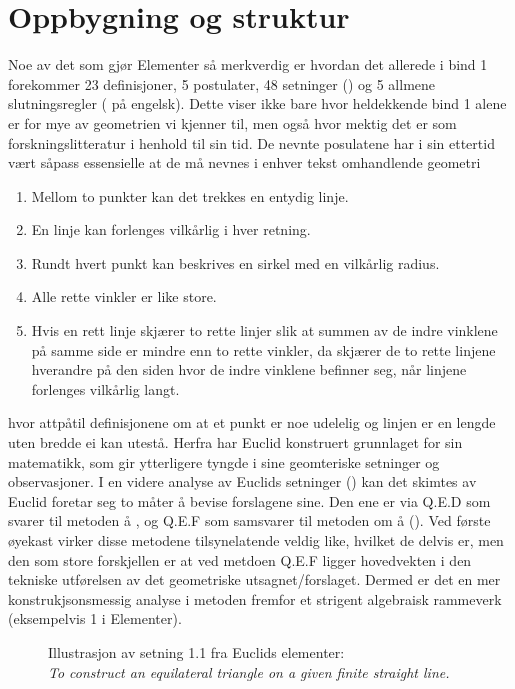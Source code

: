 \documentclass[12pt,
               a4paper,
               article,
               oneside,
               oldfontcommands,
               norsk]{memoir}
\begin{document}
\section{\large Oppbygning og struktur}
Noe av det som gjør Elementer så merkverdig er hvordan det allerede i bind 1 forekommer 23 definisjoner, 5 postulater, 48 setninger () og 5 allmene slutningsregler ( på engelsk). Dette viser ikke bare hvor heldekkende bind 1 alene er for mye av geometrien vi kjenner til, men også hvor mektig det er som forskningslitteratur i henhold til sin tid. De nevnte posulatene har i sin ettertid vært såpass essensielle at de må nevnes i enhver tekst omhandlende geometri 
\begin{enumerate}
\item Mellom to punkter kan det trekkes en entydig linje.
\item En linje kan forlenges vilkårlig i hver retning.
\item Rundt hvert punkt kan beskrives en sirkel med en vilkårlig radius.
\item Alle rette vinkler er like store.
\item Hvis en rett linje skjærer to rette linjer slik at summen av de indre vinklene på samme side er mindre enn to rette vinkler, da skjærer de to rette linjene hverandre på den siden hvor de indre vinklene befinner seg, når linjene forlenges vilkårlig langt.
\end{enumerate}
hvor attpåtil definisjonene om at et punkt er noe udelelig og linjen er en lengde uten bredde ei kan utestå. Herfra har Euclid konstruert grunnlaget for sin matematikk, som gir ytterligere tyngde i sine geomteriske setninger og observasjoner. I en videre analyse av Euclids setninger () kan det skimtes av Euclid foretar seg to måter å bevise forslagene sine. Den ene er via Q.E.D som svarer til metoden å , og Q.E.F som samsvarer til metoden om å (). Ved første øyekast virker disse metodene tilsynelatende veldig like, hvilket de delvis er, men den som store forskjellen er at ved metdoen Q.E.F ligger hovedvekten i den tekniske utførelsen av det geometriske utsagnet/forslaget. Dermed er det en mer konstrukjsonsmessig analyse i metoden fremfor et strigent algebraisk rammeverk (eksempelvis  1 i Elementer). \cite{Elementer}
\begin{figure}[H]
\centering
\captionsetup{justification=centering,margin=2cm}

\caption*{Illustrasjon av setning 1.1 fra Euclids elementer: \vspace{2mm}\\ \emph{To construct an equilateral triangle on a given finite straight line.}}
\end{figure}
\end{document}
